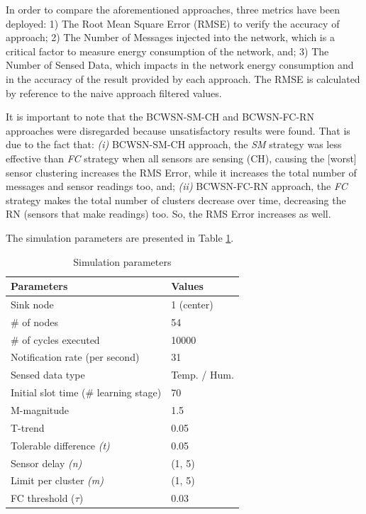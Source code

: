 \documentclass{acm_proc_article-sp}
\begin{document}
In order to compare the aforementioned approaches, three metrics have been
deployed: 1) The Root Mean Square Error (RMSE) to verify the accuracy of
approach; 2) The Number of Messages injected into the network, which is a
critical factor to measure energy consumption of the network, and; 3) The
Number of Sensed Data, which impacts in the network energy consumption and in
the accuracy of the result provided by each approach. The RMSE is calculated by
reference to the naive approach filtered values.

It is important to note that the BCWSN-SM-CH and BCWSN-FC-RN approaches were
disregarded because unsatisfactory results were found. That is due to the fact
that: {\it
  (i)} BCWSN-SM-CH approach, the \textit{SM} strategy was less effective than
  \textit{FC} strategy when all sensors are sensing (CH), causing the [worst]
  sensor clustering increases the RMS Error, while it increases the total number of
  messages and sensor readings too, and; {\it
  (ii)} BCWSN-FC-RN approach, the \textit{FC} strategy makes the total number of
  clusters decrease over time, decreasing the RN (sensors that make readings)
  too. So, the RMS Error increases as well.

The simulation parameters are presented in Table \ref{tab:parameters}.

\begin{table}[h!]
\caption{Simulation parameters}
\label{tab:parameters}
\begin{center}
\begin{tabular}{|l||l|}
\hline
Parameters &Values\\
\hline\hline
Sink node &1 (center) \\
\hline
\# of nodes &54 \\
\hline
\# of cycles executed &10000 \\
\hline
Notification rate (per second) &31 \\
\hline
Sensed data type &Temp. / Hum. \\
\hline
Initial slot time (\# learning stage) &70 \\
\hline
M-magnitude &1.5 \\
\hline
T-trend &0.05 \\
\hline
Tolerable difference {\it(t)} &0.05 \\
\hline
Sensor delay {\it(n)} &(1, 5) \\
\hline
Limit per cluster {\it(m)} &(1, 5) \\
\hline
FC threshold ($\tau$) &0.03 \\
\hline
\end{tabular}
\end{center}
\end{table}
\end{document}
